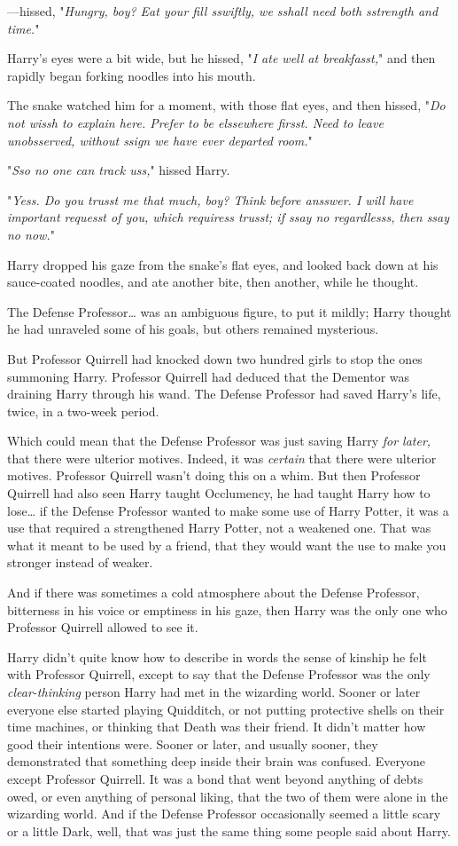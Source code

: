 ---hissed, "\emph{Hungry, boy? Eat your fill sswiftly, we sshall need both 
sstrength and time.}"

Harry's eyes were a bit wide, but he hissed, "\emph{I ate well at breakfasst,}" 
and then rapidly began forking noodles into his mouth.

The snake watched him for a moment, with those flat eyes, and then hissed, 
"\emph{Do not wissh to explain here. Prefer to be elssewhere firsst. Need to 
leave unobsserved, without ssign we have ever departed room.}"

"\emph{Sso no one can track uss,}" hissed Harry.

"\emph{Yess. Do you trusst me that much, boy? Think before ansswer. I will have 
important requesst of you, which requiress trusst; if ssay no regardlesss, then 
ssay no now.}"

Harry dropped his gaze from the snake's flat eyes, and looked back down at his 
sauce-coated noodles, and ate another bite, then another, while he thought.

The Defense Professor{\ldots} was an ambiguous figure, to put it mildly; Harry 
thought he had unraveled some of his goals, but others remained mysterious.

But Professor Quirrell had knocked down two hundred girls to stop the ones 
summoning Harry. Professor Quirrell had deduced that the Dementor was draining 
Harry through his wand. The Defense Professor had saved Harry's life, twice, in 
a two-week period.

Which could mean that the Defense Professor was just saving Harry \emph{for 
later,} that there were ulterior motives. Indeed, it was \emph{certain} that 
there were ulterior motives. Professor Quirrell wasn't doing this on a whim. 
But then Professor Quirrell had also seen Harry taught Occlumency, he had 
taught Harry how to lose{\ldots} if the Defense Professor wanted to make some 
use of Harry Potter, it was a use that required a strengthened Harry Potter, 
not a weakened one. That was what it meant to be used by a friend, that they 
would want the use to make you stronger instead of weaker.

And if there was sometimes a cold atmosphere about the Defense Professor, 
bitterness in his voice or emptiness in his gaze, then Harry was the only one 
who Professor Quirrell allowed to see it.

Harry didn't quite know how to describe in words the sense of kinship he felt 
with Professor Quirrell, except to say that the Defense Professor was the only 
\emph{clear-thinking} person Harry had met in the wizarding world. Sooner or 
later everyone else started playing Quidditch, or not putting protective shells 
on their time machines, or thinking that Death was their friend. It didn't 
matter how good their intentions were. Sooner or later, and usually sooner, 
they demonstrated that something deep inside their brain was confused. Everyone 
except Professor Quirrell. It was a bond that went beyond anything of debts 
owed, or even anything of personal liking, that the two of them were alone in 
the wizarding world. And if the Defense Professor occasionally seemed a little 
scary or a little Dark, well, that was just the same thing some people said 
about Harry.


